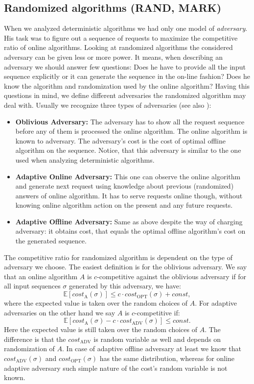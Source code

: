 \subsection{Randomized algorithms (RAND, MARK)}
When we analyzed deterministic algorithms we had only one model of 
\textit{adversary}. His task was to figure out a sequence of requests to 
maximize the competitive ratio of online algorithms. Looking at randomized 
algorithms the considered adversary can be given less or more power. It means,
when describing an adversary we should answer few questions: Does he have to 
provide all the input sequence explicitly or it can generate the sequence in the on-line fashion? 
Does he know the algorithm and randomization used by the online algorithm? Having this questions 
in mind, we define different adversaries the randomized algorithm may deal with.
Usually we recognize three types of adversaries
(see also \cite{bbktw}):
\begin{itemize}
\item \textbf{Oblivious Adversary:} The adversary has to show all the request 
sequence before any of them is processed the online algorithm. The online algorithm is known to 
adversary. The adversary's cost is the cost of optimal offline algorithm on the 
sequence. Notice, that this adversary is similar to the one used when analyzing
deterministic algorithms.
\item \textbf{Adaptive Online Adversary:} This one can observe the online 
algorithm and generate next request using knowledge about previous (randomized) 
answers of online algorithm. It has to serve requests online though, without 
knowing online algorithm action on the present and any future requests.
\item \textbf{Adaptive Offline Adversary:} Same as above despite the 
way of charging adversary: it obtains cost, that equals the optimal offline algorithm's cost
on the generated sequence.
\end{itemize}
The competitive ratio for randomized algorithm is dependent on the type of 
adversary we choose. The easiest definition is for the oblivious adversary. We say 
that an online algorithm $A$ is $c$-competitive against the oblivious adversary if for 
all input sequences $\sigma$ generated by this adversary, we have:
$$\mathbb{E}[cost_{\mathrm{A}}(\sigma)] \leq c\cdot cost_{\mathrm{OPT}}(\sigma) 
+ const,$$
where the expected value is taken over the random choices of $A$. For adaptive 
adversaries on the other hand we say $A$ is $c$-competitive if:
$$\mathbb{E}[cost_{\mathrm{A}}(\sigma) - c \cdot cost_{\mathrm{ADV}}(\sigma)]
\leq const.$$
Here the expected value is still taken over the random choices of $A$. The difference 
is that the $cost_{\mathrm{ADV}}$ is random variable as well and depends on randomization 
of $A$. 
In case of adaptive offline adversary at least we know that 
$cost_{\mathrm{ADV}}(\sigma)$ and $cost_{\mathrm{OPT}}(\sigma)$ has the same 
distribution, whereas for online 
adaptive adversary such simple nature of the cost's random variable is not known.

